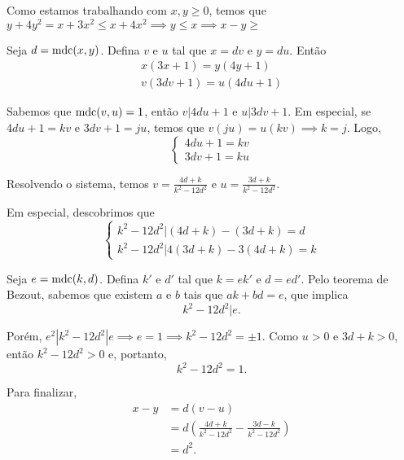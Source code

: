 Como estamos trabalhando com $x, y \ge 0$, temos que $y + 4y^2 = x + 3x^2 \le x + 4x^2 \implies y \le x \implies x - y \ge$

Seja $d = \operatorname{mdc}(x, y)$. Defina $v$ e $u$ tal que $x = dv$ e $y = du$. Então
\begin{gather*}
	x(3x + 1) = y(4y + 1)\\
	v(3dv + 1) = u(4du + 1)
\end{gather*}

Sabemos que $\operatorname{mdc}(v, u) = 1$, então $v | 4du + 1$ e $u | 3dv + 1$. Em especial, se $4du + 1 = kv$ e $3dv + 1 = ju$, temos que $v(ju) = u(kv) \implies k = j$. Logo, \[
\begin{cases}
	4du + 1 = kv\\
	3dv + 1 = ku
\end{cases}\]

Resolvendo o sistema, temos $v = \frac{4d + k}{k^2 - 12d^2}$ e $u = \frac{3d + k}{k^2 - 12d^2}$.

Em especial, descobrimos que \[
\begin{cases}
	k^2 - 12d^2 | (4d + k) - (3d + k) = d\\
	k^2 - 12d^2 | 4(3d + k) - 3(4d + k) = k
\end{cases}\]

Seja $e = \operatorname{mdc}(k, d)$. Defina $k'$ e $d'$ tal que $k = ek'$ e $d = ed'$. Pelo teorema de Bezout, sabemos que existem $a$ e $b$ tais que $ak + bd = e$, que implica \[k^2 - 12d^2 | e.\]

Porém, $e^2 | k^2 - 12d^2 | e \implies e = 1 \implies k^2 - 12d^2 = \pm1$. Como $u > 0$ e $3d + k > 0$, então $k^2 - 12d^2 > 0$ e, portanto, \[k^2 - 12d^2 = 1.\]

Para finalizar,
\begin{align*}
	x - y &= d(v - u) \\
	      &= d(\frac{4d + k}{k^2 - 12d^2} - \frac{3d - k}{k^2 - 12d^2}) \\
		  &= d^2.
\end{align*}
